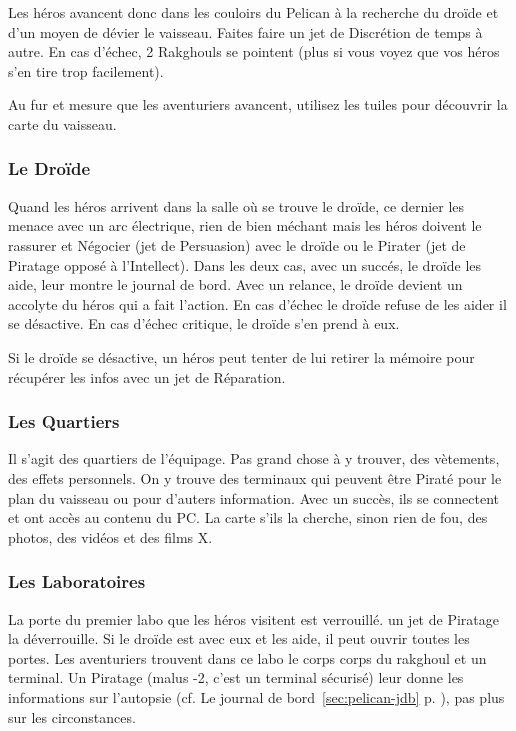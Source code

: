 \documentclass{jdrp}
\begin{document}
Les héros avancent donc dans les couloirs du Pelican à la recherche du droïde et d'un moyen de dévier le vaisseau. Faites faire un jet de Discrétion de temps à autre. En cas d'échec, 2 Rakghouls se pointent (plus si vous voyez que vos héros s'en tire trop facilement).

Au fur et mesure que les aventuriers avancent, utilisez les tuiles pour découvrir la carte du vaisseau.

\subsubsection{Le Droïde}
Quand les héros arrivent dans la salle où se trouve le droïde, ce dernier les menace avec un arc électrique, rien de bien méchant mais les héros doivent le rassurer et Négocier (jet de Persuasion) avec le droïde ou le Pirater (jet de Piratage opposé à l'Intellect). Dans les deux cas, avec un succés, le droïde les aide, leur montre le journal de bord. Avec un relance, le droïde devient un accolyte du héros qui a fait l'action. En cas d'échec le droïde refuse de les aider il se désactive. En cas d'échec critique, le droïde s'en prend à eux.

Si le droïde se désactive, un héros peut tenter de lui retirer la mémoire pour récupérer les infos avec un jet de Réparation. 

\subsubsection{Les Quartiers}
Il s'agit des quartiers de l'équipage. Pas grand chose à y trouver, des vètements, des effets personnels. On y trouve des terminaux qui peuvent être Piraté pour le plan du vaisseau ou pour d'auters information. Avec un succès, ils se connectent et ont accès au contenu du PC. La carte s'ils la cherche, sinon rien de fou, des photos, des vidéos et des films X.

\subsubsection{Les Laboratoires}
La porte du premier labo que les héros visitent est verrouillé. un jet de Piratage la déverrouille. Si le droïde est avec eux et les aide, il peut ouvrir toutes les portes. Les aventuriers trouvent dans ce labo le corps corps du rakghoul et un terminal. Un Piratage (malus -2, c'est un terminal sécurisé) leur donne les informations sur l'autopsie (cf. Le journal de bord~\ref{sec:pelican-jdb} p. \pageref{sec:pelican-jdb}), pas plus sur les circonstances.
\end{document}
